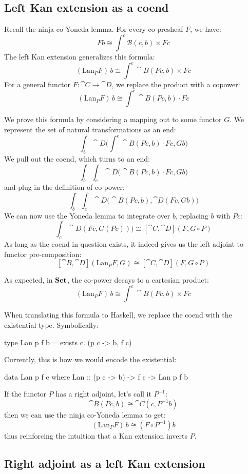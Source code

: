 \documentclass[DaoFP]{subfiles}
\begin{document}
\subsection{Left Kan extension as a coend}

Recall the ninja co-Yoneda lemma. For every co-presheaf $F$, we have:
\[ F b \cong \int^{c} \mathcal{B}(c, b) \times F c \]
The left Kan extension generalizes this formula:
\[ (\text{Lan}_P F)\, b \cong \int^{c} \cat B (P c, b) \times F c \]
For a general functor $F \colon \cat C \to \cat D$, we replace the product with a copower:
\[ (\text{Lan}_P F)\, b \cong \int^{c} \cat B(P c, b) \cdot F c \]

We prove this formula by considering a mapping out to some functor $G$. We represent the set of natural transformations as an end:
\[\int_b \cat D \big(\int^c \cat B(P c, b) \cdot F c, G b\big) \]
We pull out the coend, which turns to an end:
\[\int_b \int_c \cat D \big(\cat B(P c, b) \cdot F c, G b\big) \]
and plug in the definition of co-power:
\[\int_b \int_c \cat D \big(\cat B(P c, b), \cat D (F c, G b)\big) \]
We can now use the Yoneda lemma to integrate over $b$, replacing $b$ with $P c$:
\[\int_c \cat D (F c, G (P c))\big) \cong  [\cat C, \cat D] (F, G \circ P) \]
As long as the coend in question exists, it indeed gives us the left adjoint to functor pre-composition:
\[ [\cat B, \cat D](\text{Lan}_P F , G) \cong  [\cat C, \cat D] (F, G \circ P) \]

As expected, in $\mathbf{Set}$, the co-power decays to a cartesian product:
\[ (\text{Lan}_P F)\, b \cong \int^{c} \cat B (P c, b) \times F c \]

When translating this formula to Haskell, we replace the coend with the existential type. Symbolically:
 \begin{haskell}
 type Lan p f b = exists c. (p c -> b, f c)
 \end{haskell}
Currently, this is how we would encode the existential:
 \begin{haskell}
 data Lan p f e where
   Lan :: (p c -> b) -> f c -> Lan p f b
 \end{haskell}
 
 If the functor $P$ has a right adjoint, let's call it $P^{-1}$:
 \[ \cat B(P c , b) \cong \cat C(c, P^{-1} b) \]
 then we can use the ninja co-Yoneda lemma to get:
 \[  (\text{Lan}_P F)\, b \cong (F \circ P^{-1}) b \]
 thus reinforcing the intuition that a Kan extension inverts $P$.
 
\subsection{Right adjoint as a left Kan extension}
\end{document}
